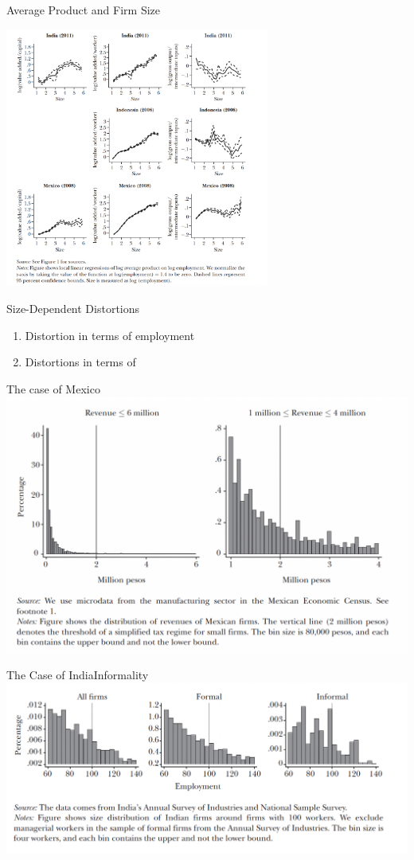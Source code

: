 \documentclass[usenames,dvipsnames,aspectratio=32]{beamer}
\begin{document}
\begin{frame}{Average Product and Firm Size}
\begin{center}
    \includegraphics[width=0.65\textwidth]{Figures/ReturnFirmSize.png}
\end{center}
\end{frame}

\begin{frame}{Size-Dependent Distortions}
    \begin{enumerate}[label=\textbf{\textcolor{violet}{\arabic*.}}]
        \item Distortion in terms of employment
        \item Distortions in terms of 
    \end{enumerate}
\end{frame}

\begin{frame}{The case of Mexico}
    \includegraphics[width=\textwidth]{Figures/MexicoSizeDependent.png}
\end{frame}

\begin{frame}{The Case of India}{Informality}
    \includegraphics[width=\textwidth]{Figures/IndiaSizeDependent.png}
\end{frame}
\end{document}
